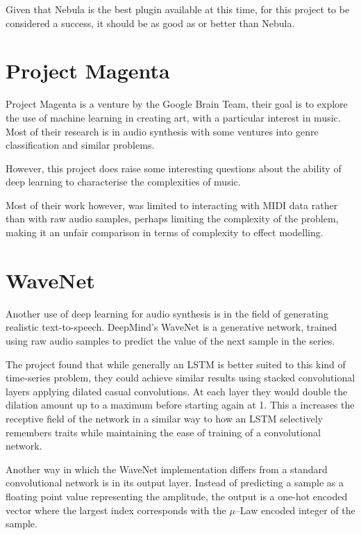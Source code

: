 \documentclass{l4proj}
\begin{document}
Given that Nebula is the best plugin available at this time, for this
project to be considered a success, it should be as good as or better
than Nebula.

\section{Project Magenta}\label{project-magenta}

Project Magenta is a venture by the Google Brain Team, their goal is to
explore the use of machine learning in creating art, with a particular
interest in music. Most of their research is in audio synthesis with
some ventures into genre classification and similar problems.

However, this project does raise some interesting questions about the
ability of deep learning to characterise the complexities of music.

Most of their work however, was limited to interacting with MIDI data
rather than with raw audio samples, perhaps limiting the complexity of
the problem, making it an unfair comparison in terms of complexity to
effect modelling.

\section{WaveNet}\label{wavenet}

Another use of deep learning for audio synthesis is in the field of
generating realistic text-to-speech. DeepMind's WaveNet is a generative
network, trained using raw audio samples to predict the value of the
next sample in the series.

The project found that while generally an LSTM is better suited to this
kind of time-series problem, they could achieve similar results using
stacked convolutional layers applying dilated casual convolutions. At
each layer they would double the dilation amount up to a maximum before
starting again at 1. This a increases the receptive field of the network
in a similar way to how an LSTM selectively remembers traits while
maintaining the ease of training of a convolutional network.

Another way in which the WaveNet implementation differs from a standard
convolutional network is in its output layer. Instead of predicting a
sample as a floating point value representing the amplitude, the output
is a one-hot encoded vector where the largest index corresponds with the
\(\mu\)--Law encoded integer of the sample.
\end{document}
